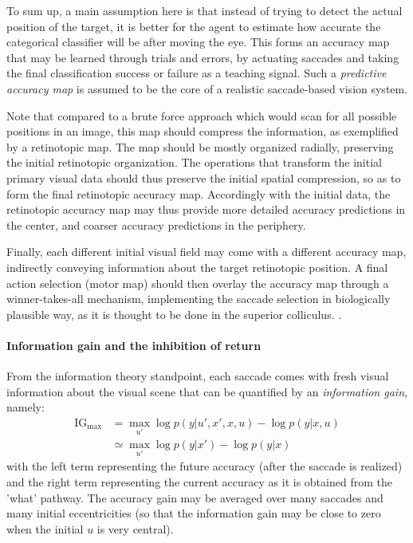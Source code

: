 To sum up, a main assumption here is that instead of trying to detect the actual position of the target, it is better for the agent to estimate how accurate the categorical classifier will be after moving the eye. This forms an accuracy map that may be learned through trials and errors, by actuating saccades %
and taking the final classification success or failure as a teaching signal.
Such a \emph{predictive accuracy map} is assumed to be the core of a realistic saccade-based vision system.

Note that compared to a brute force approach which would scan for all possible positions in an image, this map should compress the information, as exemplified by a retinotopic map. The map should be mostly organized radially, preserving the initial retinotopic organization. %
The operations that transform the initial primary visual data should thus preserve the initial spatial compression, so as to form the final  retinotopic accuracy map. Accordingly with the initial data, the retinotopic accuracy map may thus provide more detailed accuracy predictions in the center, and coarser accuracy predictions in the periphery. 

Finally, each different initial visual field may come with a different accuracy map, indirectly conveying information about the target retinotopic position. 
A final action selection (motor map) should then overlay the accuracy map through a winner-takes-all mechanism, implementing the saccade selection in biologically plausible way, as it is thought to be done in the superior colliculus\ICANN .
.

\paragraph{Information gain and the inhibition of return}
From the information theory standpoint, each saccade comes with fresh visual information about the visual scene that can be quantified by an \emph{information gain}, namely:
\begin{align}
\text{IG}_\text{max} &= \max_{u'} \log p(y|u',x',x, u) - \log p(y|x, u)\\
          &\simeq \max_{u'} \log p(y|x') - \log p(y|x)
\end{align}
with the left term representing the future accuracy (after the saccade is realized) and the right term representing the current accuracy as it is obtained from the 'what' pathway. The accuracy gain may be averaged over many saccades and many initial eccentricities (so that the information gain may be close to zero when the initial $u$ is very central). 

